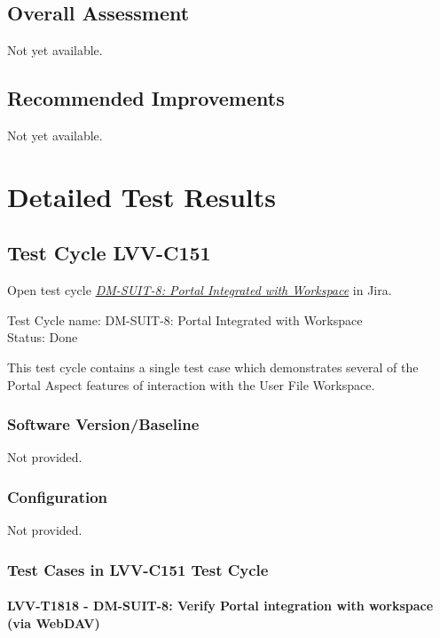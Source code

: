 \documentclass[DM,lsstdraft,STR,toc]{lsstdoc}
\begin{document}
\subsection{Overall Assessment}
\label{sect:overallassessment}

Not yet available.

\subsection{Recommended Improvements}
\label{sect:recommendations}

Not yet available.

\newpage
\section{Detailed Test Results}
\label{sect:detailedtestresults}

\subsection{Test Cycle LVV-C151 }

Open test cycle {\it \href{https://jira.lsstcorp.org/secure/Tests.jspa#/testrun/LVV-C151}{DM-SUIT-8: Portal Integrated with Workspace}} in Jira.

Test Cycle name: DM-SUIT-8: Portal Integrated with Workspace\\
Status: Done

This test cycle contains a single test case which demonstrates several
of the Portal Aspect features of interaction with the User File
Workspace.

\subsubsection{Software Version/Baseline}
Not provided.

\subsubsection{Configuration}
Not provided.

\subsubsection{Test Cases in LVV-C151 Test Cycle}

\paragraph{ LVV-T1818 - DM-SUIT-8: Verify Portal integration with workspace (via WebDAV) }\mbox{}\\
\end{document}

